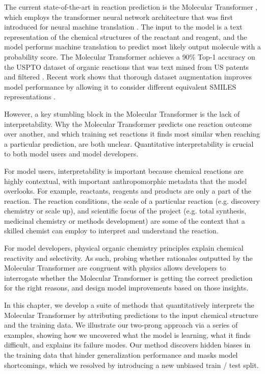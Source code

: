 The current state-of-the-art in reaction prediction is the Molecular Transformer \cite{Schwaller2019}, which employs the transformer neural network architecture that was first introduced for neural machine translation \cite{Vaswani2017}. The input to the model is a text representation of the chemical structures of the reactant and reagent, and the model performs machine translation to predict most likely output molecule with a probability score. The Molecular Transformer achieves a 90\% Top-1 accuracy on the USPTO dataset of organic reactions that was text mined from US patents \cite{Lowe2012} and filtered \cite{Jin2017}. Recent work shows that thorough dataset augmentation improves model performance by allowing it to consider different equivalent SMILES representations \cite{tetko2020state}.

However, a key stumbling block in the Molecular Transformer is the lack of interpretability. Why the Molecular Transformer predicts one reaction outcome over another, and which training set reactions it finds most similar when reaching a particular prediction, are both unclear. Quantitative interpretability is crucial to both model users and model developers.

For model users, interpretability is important because chemical reactions are highly contextual, with important anthropomorphic metadata that the model overlooks. For example, reactants, reagents and products are only a part of the reaction. The reaction conditions, the scale of a particular reaction (e.g. discovery chemistry or scale up), and scientific focus of the project (e.g. total synthesis, medicinal chemistry or methods development) are some of the context that a skilled chemist can employ to interpret and understand the reaction.

For model developers, physical organic chemistry principles explain chemical reactivity and selectivity. As such, probing whether rationales outputted by the Molecular Transformer are congruent with physics allows developers to interrogate whether the Molecular Transformer is getting the correct prediction for the right reasons, and design model improvements based on those insights. 

In this chapter, we develop a suite of methods that quantitatively interprets the Molecular Transformer by attributing predictions to the input chemical structure and the training data. We illustrate our two-prong approach via a series of examples, showing how we uncovered what the model is learning, what it finds difficult, and explains its failure modes. Our method discovers hidden biases in the training data that hinder generalization performance and masks model shortcomings, which we resolved by introducing a new unbiased train / test split. 

